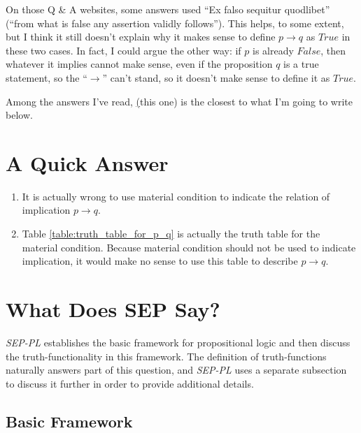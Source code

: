 \documentclass[12pt, letterpaper]{article}
\begin{document}
On those Q \& A websites, some answers used ``Ex falso sequitur quodlibet''
(``from what is false any assertion validly follows''). This helps, to some
extent, but I think it still doesn't explain why it makes sense to define $p
  \rightarrow q$ as $True$ in these two cases. In fact, I could argue the other way:
if $p$ is already $False$, then whatever it implies cannot make sense, even if
the proposition $q$ is a true statement, so the ``$\rightarrow$'' can't stand,
so it doesn't make sense to define it as $True$.

Among the answers I've read, \href{https://math.stackexchange.com/a/70739/665777}(this one)
is the closest to what I'm going to write below.

\section{A Quick Answer}

\begin{enumerate}
  \item It is actually wrong to use material condition to indicate the relation
        of implication $p \rightarrow q$.
  \item Table \ref{table:truth_table_for_p_q} is actually the truth table for
        the material condition. Because material condition should not be used to
        indicate implication, it would make no sense to use this table to describe
        $p \rightarrow q$.
\end{enumerate}

\section{What Does SEP Say?}

\textit{SEP-PL} establishes the basic framework for propositional logic and
then discuss the truth-functionality in this framework. The definition of
truth-functions naturally answers part of this question, and \textit{SEP-PL}
uses a separate subsection to discuss it further in order to provide additional
details.

\subsection{Basic Framework}
\end{document}
